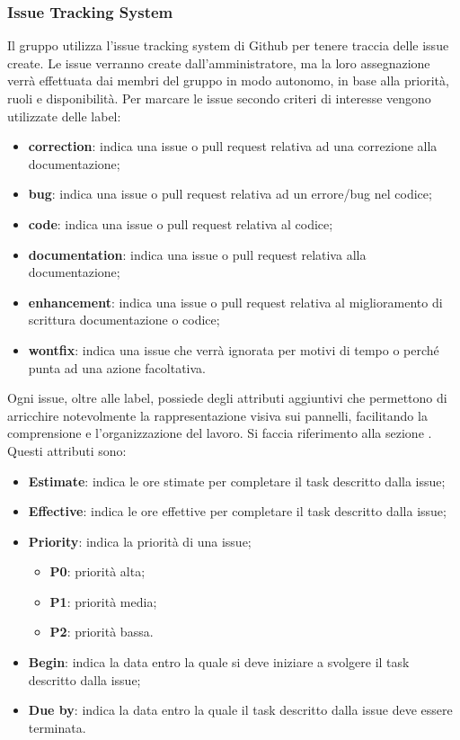         \subsubsection{Issue Tracking System}\label{inf:its}
        Il gruppo utilizza l'issue tracking system di Github per tenere traccia delle issue create. Le issue verranno
        create dall'amministratore, ma la loro assegnazione verrà effettuata dai membri del gruppo in modo autonomo, in base
        alla priorità, ruoli e disponibilità.
        Per marcare le issue secondo criteri di interesse vengono utilizzate delle label:
        \begin{itemize}
            \item \textbf{correction}: indica una issue o pull request relativa ad una correzione alla documentazione;
            \item \textbf{bug}: indica una issue o pull request relativa ad un errore/bug nel codice;
            \item \textbf{code}: indica una issue o pull request relativa al codice;
            \item \textbf{documentation}: indica una issue o pull request relativa alla documentazione;
            \item \textbf{enhancement}: indica una issue o pull request relativa al miglioramento di scrittura documentazione o codice;
            \item \textbf{wontfix}: indica una issue che verrà ignorata per motivi di tempo o perché punta ad una azione facoltativa.
        \end{itemize}
        Ogni issue, oltre alle label, possiede degli attributi aggiuntivi che permettono di arricchire
        notevolmente la rappresentazione visiva sui pannelli, facilitando la comprensione e l'organizzazione del lavoro.
        Si faccia riferimento alla sezione .
        Questi attributi sono:
        \begin{itemize}
            \item \textbf{Estimate}: indica le ore stimate per completare il task descritto dalla issue;
            \item \textbf{Effective}: indica le ore effettive per completare il task descritto dalla issue;
            \item \textbf{Priority}: indica la priorità di una issue;
            \begin{itemize}
                \item \textbf{P0}: priorità alta;
                \item \textbf{P1}: priorità media;
                \item \textbf{P2}: priorità bassa.
            \end{itemize}
            \item \textbf{Begin}: indica la data entro la quale si deve iniziare a svolgere il task descritto dalla issue;
            \item \textbf{Due by}: indica la data entro la quale il task descritto dalla issue deve essere terminata.
        \end{itemize}

